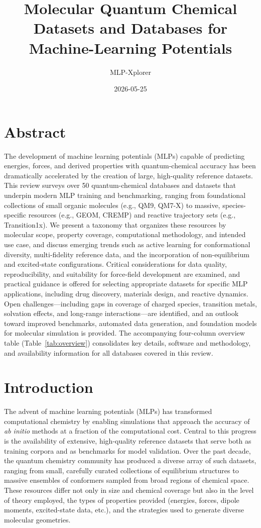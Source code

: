 \documentclass[12pt]{article}
\title{Molecular Quantum Chemical Datasets and Databases for Machine-Learning Potentials}
\author{MLP-Xplorer}
\date{2026-05-25}
\begin{document}
\maketitle

\section*{Abstract}

The development of machine learning potentials (MLPs) capable of predicting energies, forces, and derived properties with quantum-chemical accuracy has been dramatically accelerated by the creation of large, high-quality reference datasets. This review surveys over 50 quantum-chemical databases and datasets that underpin modern MLP training and benchmarking, ranging from foundational collections of small organic molecules (e.g., QM9, QM7-X) to massive, species-specific resources (e.g., GEOM, CREMP) and reactive trajectory sets (e.g., Transition1x). We present a taxonomy that organizes these resources by molecular scope, property coverage, computational methodology, and intended use case, and discuss emerging trends such as active learning for conformational diversity, multi-fidelity reference data, and the incorporation of non-equilibrium and excited-state configurations. Critical considerations for data quality, reproducibility, and suitability for force-field development are examined, and practical guidance is offered for selecting appropriate datasets for specific MLP applications, including drug discovery, materials design, and reactive dynamics. Open challenges—including gaps in coverage of charged species, transition metals, solvation effects, and long-range interactions—are identified, and an outlook toward improved benchmarks, automated data generation, and foundation models for molecular simulation is provided. The accompanying four-column overview table (Table~\ref{tab:overview}) consolidates key details, software and methodology, and availability information for all databases covered in this review.

\section{Introduction}

The advent of machine learning potentials (MLPs) has transformed computational chemistry by enabling simulations that approach the accuracy of \textit{ab initio} methods at a fraction of the computational cost. Central to this progress is the availability of extensive, high-quality reference datasets that serve both as training corpora and as benchmarks for model validation. Over the past decade, the quantum chemistry community has produced a diverse array of such datasets, ranging from small, carefully curated collections of equilibrium structures to massive ensembles of conformers sampled from broad regions of chemical space. These resources differ not only in size and chemical coverage but also in the level of theory employed, the types of properties provided (energies, forces, dipole moments, excited-state data, etc.), and the strategies used to generate diverse molecular geometries.
\end{document}
